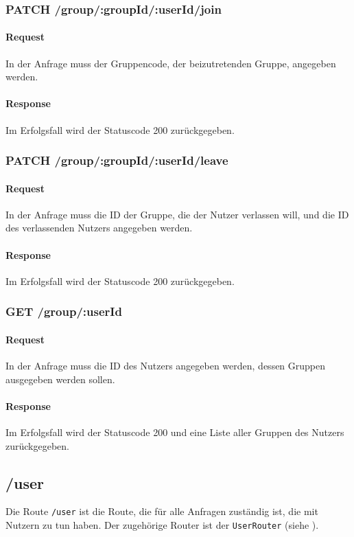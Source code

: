 \documentclass{entwurfsheft}
\begin{document}
\subsubsection*{PATCH /group/:groupId/:userId/join}
    \paragraph{Request}
        In der Anfrage muss der Gruppencode, der beizutretenden Gruppe, angegeben werden.
    \paragraph{Response}
        Im Erfolgsfall wird der Statuscode 200 zurückgegeben.
        
\subsubsection*{PATCH /group/:groupId/:userId/leave}
    \paragraph{Request}
        In der Anfrage muss die ID der Gruppe, die der Nutzer verlassen will, und die ID des verlassenden Nutzers angegeben werden.
    \paragraph{Response}
        Im Erfolgsfall wird der Statuscode 200 zurückgegeben.
    
\subsubsection*{GET /group/:userId}
    \paragraph{Request}
        In der Anfrage muss die ID des Nutzers angegeben werden, dessen Gruppen ausgegeben werden sollen.
    \paragraph{Response}
        Im Erfolgsfall wird der Statuscode 200 und eine Liste aller Gruppen des Nutzers zurückgegeben.


\subsection{/user}
Die Route \texttt{/user} ist die Route, die für alle Anfragen zuständig ist, die mit Nutzern zu tun haben.
Der zugehörige Router ist der \texttt{UserRouter} (siehe ).
\end{document}
